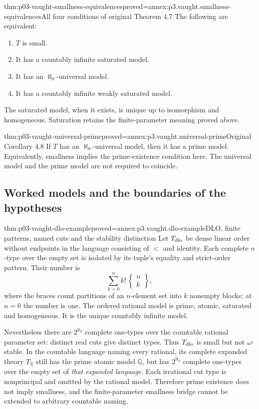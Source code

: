 \begin{hbtheorem}{thm:p03-vaught-smallness-equivalences}{proved=annex:p3.vaught.smallness-equivalences}{All four conditions of original Theorem 4.7}
The following are equivalent:
\begin{enumerate}
\item \(T\) is small.
\item It has a countably infinite saturated model.
\item It has an \(\aleph_0\)-universal model.
\item It has a countably infinite weakly saturated model.
\end{enumerate}
The saturated model, when it exists, is unique up to isomorphism
and homogeneous. Saturation retains the finite-parameter meaning
proved above.
\end{hbtheorem}

\begin{hbcorollary}{thm:p03-vaught-universal-prime}{proved=annex:p3.vaught.universal-prime}{Original Corollary 4.8}
If \(T\) has an \(\aleph_0\)-universal model, then it has a prime model.
Equivalently, smallness implies the prime-existence condition here.
The universal model and the prime model are not required to coincide.
\end{hbcorollary}

\subsection{Worked models and the boundaries of the hypotheses}
\label{sec:p03-vaught-examples}

\begin{hbtheorem}{thm:p03-vaught-dlo-example}{proved=annex:p3.vaught.dlo-example}{DLO, finite patterns, named cuts and the stability distinction}
Let \(T_{\rm dlo}\) be dense linear order without endpoints in the
language consisting of \(<\) and identity.
Each complete \(n\)-type over the empty set is isolated by its tuple's
equality and strict-order pattern. Their number is
\[
              \sum_{k=0}^n k!\,\left\{\begin{matrix}n\\k\end{matrix}\right\},
\]
where the braces count partitions of an \(n\)-element set into
\(k\) nonempty blocks; at \(n=0\) the number is one.
The ordered rational model is prime, atomic, saturated and homogeneous.
It is the unique countably infinite model.

Nevertheless there are \(2^{\aleph_0}\) complete one-types over the
countable rational parameter set: distinct real cuts give distinct types.
Thus \(T_{\rm dlo}\) is small but not \(\omega\)-stable.
In the countable language naming every rational, its complete expanded
theory \(T_{\mathbb Q}\) still has the prime atomic model \(\mathbb Q\),
but has \(2^{\aleph_0}\) complete one-types over the empty set of
\emph{that expanded language}. Each irrational cut type is nonprincipal
and omitted by the rational model. Therefore prime existence does not
imply smallness, and the finite-parameter smallness bridge cannot be
extended to arbitrary countable naming.
\end{hbtheorem}

